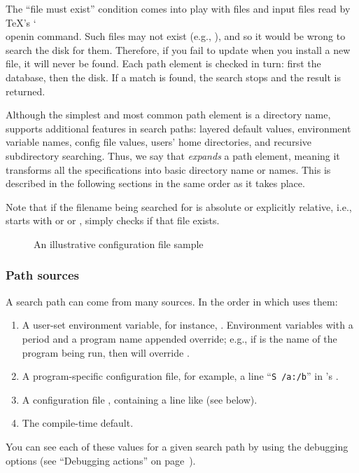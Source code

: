 \documentclass{article}
\DeclareRobustCommand{\cs}[1]{{\normalfont\ttfamily\char`\\#1}}
\begin{document}
The ``file must exist'' condition comes into play with  files and
input files read by \TeX's \cs{openin} command.  Such files may not
exist (e.g., ), and so it would be wrong to search the
disk for them.  Therefore, if you fail to update  when you
install a new  file, it will never be found.
Each path element is checked in turn: first the database, then the
disk.  If a match is found, the search stops and the result is
returned.

Although the simplest and most common path element is a directory
name, \KPS{} supports additional features in search paths: layered
default values, environment variable names, config file values, users'
home directories, and recursive subdirectory searching.  Thus, we say
that \KPS{} \emph{expands} a path element, meaning it transforms all
the specifications into basic directory name or names.  This is
described in the following sections in the same order as it takes
place.

Note that if the filename being searched for is absolute or explicitly
relative, i.e., starts with \samp{/} or  or ,
\KPS{} simply checks if that file exists.

\ifSingleColumn
\else
\begin{figure*}

\setlength{\abovecaptionskip}{0pt}
  \caption{An illustrative configuration file sample}
  \label{fig:config-sample}
\end{figure*}
\fi

\subsubsection{Path sources}
\label{Path-sources}

A search path can come from many sources.  In the order in which
\KPS{} uses them:

\begin{enumerate}
\item 
  A user-set environment variable, for instance, \@.
  Environment variables with a period and a program name appended
  override; e.g., if  is the name of the program being run,
  then  will override .
\item 
  A program-specific configuration file, for exam\-ple, a line
  ``\texttt{S /a:/b}'' in 's .
\item   A \KPS{} configuration file , containing a line like
   (see below).  
\item The compile-time default.
\end{enumerate} 
\noindent You can see each of these values for a given
search path by using the debugging options (see ``Debugging actions''
on page~\pageref{Debugging}).
\end{document}

